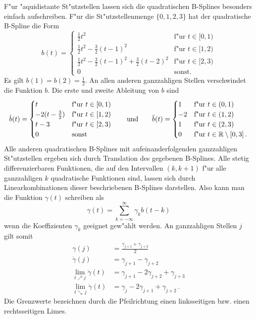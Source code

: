 \documentclass[a4paper]{scrartcl}
\newcommand{\R}{{\mathbb{R}}}
\begin{document}
F"ur "aquidistante St"utzstellen lassen sich die quadratischen B-Splines besonders einfach aufschreiben. 
F"ur die St"utzstellenmenge $\{0,1,2,3\}$ hat der quadratische B-Spline die Form
$$ b(t)=\begin{cases}
\frac12t^2 & \text{f"ur $t\in[0,1)$} \\
\frac12t^2-\frac32(t-1)^2 & \text{f"ur $t\in[1,2)$} \\
\frac12t^2-\frac32(t-1)^2+\frac32(t-2)^2 & \text{f"ur $t\in[2,3)$} \\
0 & \text{sonst.}
\end{cases} $$
Es gilt $b(1)=b(2)=\frac12$. 
An allen anderen ganzzahligen Stellen verschwindet die Funktion $b$. 
Die erste und zweite Ableitung von $b$ sind
$$ \dot b(t)=\begin{cases}
t & \text{f"ur $t\in[0,1)$} \\
-2(t-\frac32) & \text{f"ur $t\in[1,2)$} \\
t-3 & \text{f"ur $t\in[2,3)$} \\
0 & \text{sonst}
\end{cases} 
\qquad \text{und} \qquad
\ddot b(t)=\begin{cases}
1 & \text{f"ur $t\in(0,1)$} \\
-2 & \text{f"ur $t\in(1,2)$} \\
1 & \text{f"ur $t\in(2,3)$} \\
0 & \text{f"ur $t\in\R\setminus[0,3]$\,.}
\end{cases} $$
Alle anderen quadratischen B-Splines mit aufeinanderfolgenden ganzzahligen St"utzstellen ergeben sich durch Translation des gegebenen B-Splines. 
Alle stetig differenzierbaren Funktionen, die auf den Intervallen $(k,k+1)$ f"ur alle ganzzahligen $k$ quadratische Funktionen sind, lassen sich durch Linearkombinationen dieser beschriebenen B-Splines darstellen. 
Also kann man die Funktion $\gamma(t)$ schreiben als
$$ \gamma(t) = \sum_{k=-\infty}^{\infty}\gamma_kb(t-k) $$
wenn die Koeffizienten $\gamma_k$ geeignet gew"ahlt werden. 
An ganzzahligen Stellen $j$ gilt somit
\begin{align*}
\gamma(j) &= \frac{\gamma_{j+1}+\gamma_{j+2}}{2} \\
\dot\gamma(j) &= \gamma_{j+1}-\gamma_{j+2} \\
\lim_{t\nearrow j}\ddot\gamma(t) &= \gamma_{j+1}-2\gamma_{j+2}+\gamma_{j+3} \\
\lim_{t\searrow\,j}\ddot\gamma(t) &= \gamma_{j}-2\gamma_{j+1}+\gamma_{j+2}\,.
\end{align*}
Die Grenzwerte bezeichnen durch die Pfeilrichtung einen linksseitigen bzw. einen rechtsseitigen Limes. 
\end{document}
